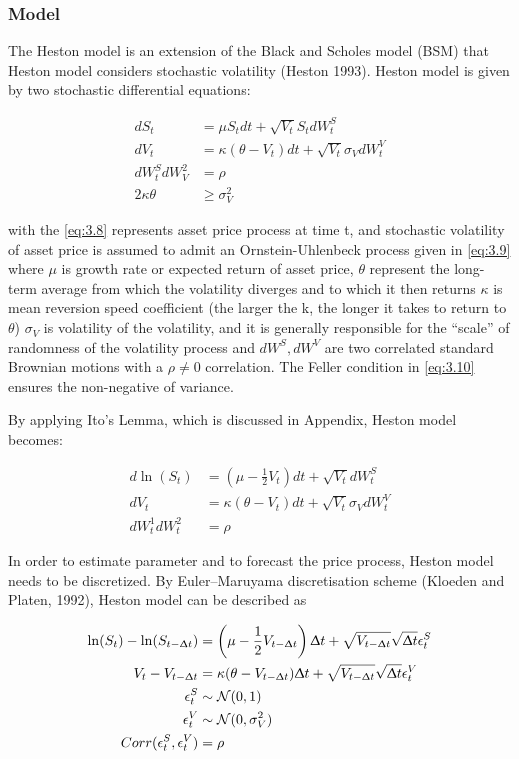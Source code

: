 \documentclass[12pt,a4paper]{article}
\numberwithin{equation}{section}
\begin{document}
\subsubsection{Model}
The Heston model is an extension of the Black and Scholes model (BSM) that Heston model considers stochastic volatility (Heston 1993). Heston model is given by two stochastic differential equations:

\begin{align}
dS_t &= \mu S_t dt + \sqrt{V_t} S_t dW_t^S \label{eq:3.8} \\ 
dV_t &= \kappa (\theta - V_t) dt + \sqrt{V_t} \sigma_V dW_t^V \label{eq:3.9} \\ 
dW_t^S dW_V^2 &= \rho \\
2\kappa \theta &\ge \sigma_V^2 \label{eq:3.10}
\end{align}

with the \eqref{eq:3.8} represents asset price process at time t, and stochastic volatility of asset price is assumed to admit an Ornstein-Uhlenbeck process given in \eqref{eq:3.9} where $\mu$ is growth rate or expected return of asset price, $\theta$ represent the long-term average from which the volatility diverges and to which it then returns $\kappa$ is mean reversion speed coefficient (the larger the k, the longer it takes to return to $\theta$)
$\sigma_V$ is volatility of the volatility, and it is generally responsible for the “scale” of randomness of the volatility process and $dW^S, dW^V$ are two correlated standard Brownian motions with a $\rho \neq 0$ correlation. The Feller condition in \eqref{eq:3.10} ensures the non-negative of variance.

By applying Ito's Lemma, which is discussed in Appendix, Heston model becomes:

\begin{align*}
d \ln(S_t) &= \left( \mu - \frac{1}{2}V_t \right) dt + \sqrt{V_t} dW_t^S \\ 
dV_t &= \kappa (\theta - V_t) dt + \sqrt{V_t} \sigma_V dW_t^V \\ 
dW_t^1 dW_t^2 &= \rho
\end{align*}

In order to estimate parameter and to forecast the price process, Heston model needs to be discretized. By Euler–Maruyama discretisation scheme (Kloeden and Platen, 1992), Heston model can be described as

\begin{align*}
\ln(S_t) - \ln(S_{t-\Updelta t}) &= \left( \mu - \frac{1}{2}V_{t-\Updelta t} \right) \Updelta t+ \sqrt{V_{t - \Updelta t}} \sqrt{\Updelta t} \epsilon_t^S\\
V_t - V_{t-\Updelta t} &= \kappa (\theta - V_{t- \Updelta t}) \Updelta t + \sqrt{V_{t - \Updelta t}} \sqrt{\Updelta t} \epsilon_t^V \\ 
\epsilon_t^S &\sim \mathcal{N}(0, 1)\\
\epsilon_t^V &\sim \mathcal{N}(0, \sigma_V^2)\\
Corr(\epsilon_t^S, \epsilon_t^V) &= \rho
\end{align*}
\end{document}
